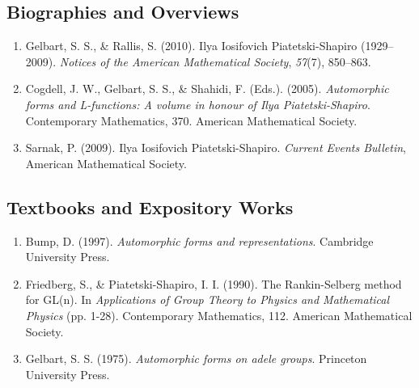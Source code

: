 \subsection*{Biographies and Overviews}
\begin{enumerate}
    \item Gelbart, S. S., \& Rallis, S. (2010). Ilya Iosifovich Piatetski-Shapiro (1929--2009). \textit{Notices of the American Mathematical Society}, \textit{57}(7), 850--863.
    \item Cogdell, J. W., Gelbart, S. S., \& Shahidi, F. (Eds.). (2005). \textit{Automorphic forms and L-functions: A volume in honour of Ilya Piatetski-Shapiro}. Contemporary Mathematics, 370. American Mathematical Society.
    \item Sarnak, P. (2009). Ilya Iosifovich Piatetski-Shapiro. \textit{Current Events Bulletin}, American Mathematical Society.
\end{enumerate}

\subsection*{Textbooks and Expository Works}
\begin{enumerate}
    \item Bump, D. (1997). \textit{Automorphic forms and representations}. Cambridge University Press.
    \item Friedberg, S., \& Piatetski-Shapiro, I. I. (1990). The Rankin-Selberg method for GL(n). In \textit{Applications of Group Theory to Physics and Mathematical Physics} (pp. 1-28). Contemporary Mathematics, 112. American Mathematical Society.
    \item Gelbart, S. S. (1975). \textit{Automorphic forms on adele groups}. Princeton University Press.
\end{enumerate}

